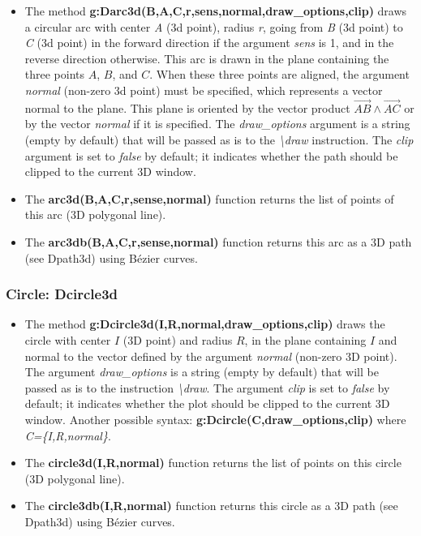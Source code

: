 \begin{itemize}
    \item The method \textbf{g:Darc3d(B,A,C,r,sens,normal,draw\_options,clip)} draws a circular arc with center \emph{A} (3d point), radius \emph{r}, going from \emph{B} (3d point) to \emph{C} (3d point) in the forward direction if the argument \emph{sens} is 1, and in the reverse direction otherwise. This arc is drawn in the plane containing the three points $A$, $B$, and $C$. When these three points are aligned, the argument \emph{normal} (non-zero 3d point) must be specified, which represents a vector normal to the plane. This plane is oriented by the vector product $\vec{AB}\wedge\vec{AC}$ or by the vector \emph{normal} if it is specified. The \emph{draw\_options} argument is a string (empty by default) that will be passed as is to the \emph{\textbackslash draw} instruction. The \emph{clip} argument is set to \emph{false} by default; it indicates whether the path should be clipped to the current 3D window.

    \item The \textbf{arc3d(B,A,C,r,sense,normal)} function returns the list of points of this arc (3D polygonal line).

    \item The \textbf{arc3db(B,A,C,r,sense,normal)} function returns this arc as a 3D path (see Dpath3d) using Bézier curves. \end{itemize}

\subsubsection{Circle: Dcircle3d}

\begin{itemize}
    \item The method \textbf{g:Dcircle3d(I,R,normal,draw\_options,clip)} draws the circle with center $I$ (3D point) and radius $R$, in the plane containing $I$ and normal to the vector defined by the argument \emph{normal} (non-zero 3D point). The argument \emph{draw\_options} is a string (empty by default) that will be passed as is to the instruction \emph{\textbackslash draw}. The argument \emph{clip} is set to \emph{false} by default; it indicates whether the plot should be clipped to the current 3D window. Another possible syntax: \textbf{g:Dcircle(C,draw\_options,clip)} where \emph{C=\{I,R,normal\}}.

    \item The \textbf{circle3d(I,R,normal)} function returns the list of points on this circle (3D polygonal line).

    \item The \textbf{circle3db(I,R,normal)} function returns this circle as a 3D path (see Dpath3d) using Bézier curves.
\end{itemize}

